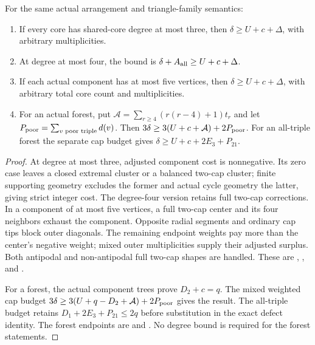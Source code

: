 \begin{theorem}\label{upper:class-corollaries}
For the same actual arrangement and triangle-family semantics:
\begin{enumerate}[label=(\roman*)]
\item If every core has shared-core degree at most three, then
$\delta\ge U+c+\Delta$, with arbitrary multiplicities.
\item At degree at most four, the bound is
$\delta+A_{\rm all}\ge U+c+\Delta$.
\item If each actual component has at most five vertices, then
$\delta\ge U+c+\Delta$, with arbitrary total core count and multiplicities.
\item For an actual forest, put
$\mathcal A=\sum_{r\ge4}(r(r-4)+1)t_r$ and let
$P_{\rm poor}=\sum_{v\text{ poor triple}}d(v)$. Then
$3\delta\ge3(U+c+\mathcal A)+2P_{\rm poor}$.
For an all-triple forest the separate cap budget gives
$\delta\ge U+c+2E_3+P_{21}$.
\end{enumerate}
\end{theorem}
\begin{proof}
At degree at most three, adjusted component cost is nonnegative. Its
zero case leaves a closed extremal cluster or a balanced two-cap cluster;
finite supporting geometry excludes the former and actual cycle geometry
the latter, giving strict integer cost. The degree-four version retains
full two-cap corrections. In a component of at most five vertices, a
full two-cap center and its four neighbors exhaust the component.
Opposite radial segments and ordinary cap tips block outer diagonals.
The remaining endpoint weights pay more than the center's negative
weight; mixed outer multiplicities supply their adjusted surplus.
Both antipodal and non-antipodal full two-cap shapes are handled.
These are
,
,
and .

For a forest, the actual component trees prove $D_2+c=q$.
The mixed weighted cap budget
$3\delta\ge3(U+q-D_2+\mathcal A)+2P_{\rm poor}$ gives the result.
The all-triple budget retains $D_1+2E_3+P_{21}\le2q$ before substitution
in the exact defect identity. The forest endpoints are
and .
No degree bound is required for the forest statements.
\end{proof}

